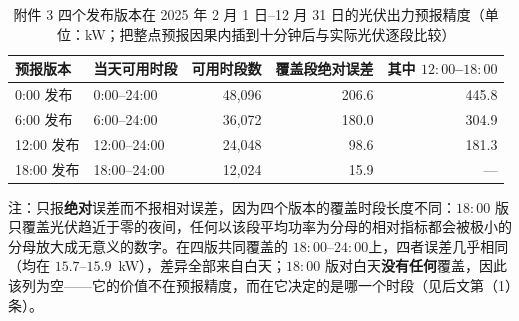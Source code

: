 \begin{table}[htbp]
  \centering
  \caption{附件 3 四个发布版本在 2025 年 2 月 1 日--12 月 31 日的光伏出力预报精度（单位：kW；把整点预报因果内插到十分钟后与实际光伏逐段比较）}
  \label{tab:p3-skill}
  \footnotesize
  \begin{tabular}{llrrr}
    \toprule
    预报版本 & 当天可用时段 & 可用时段数 & 覆盖段绝对误差 & 其中 $12{:}00$--$18{:}00$ \\
    \midrule
    0{:}00 发布 & 0{:}00--24{:}00 & 48,096 & 206.6 & 445.8 \\
    6{:}00 发布 & 6{:}00--24{:}00 & 36,072 & 180.0 & 304.9 \\
    12{:}00 发布 & 12{:}00--24{:}00 & 24,048 & 98.6 & 181.3 \\
    18{:}00 发布 & 18{:}00--24{:}00 & 12,024 & 15.9 & --- \\
    \bottomrule
  \end{tabular}
  \par\vspace{2pt}
  \begin{minipage}{.92\textwidth}\footnotesize
    注：只报\textbf{绝对}误差而不报相对误差，因为四个版本的覆盖时段长度不同：$18{:}00$ 版只覆盖光伏趋近于零的夜间，任何以该段平均功率为分母的相对指标都会被极小的分母放大成无意义的数字。在四版共同覆盖的 $18{:}00$--$24{:}00$上，四者误差几乎相同（均在 $15.7$--$15.9$~kW），差异全部来自白天；$18{:}00$ 版对白天\textbf{没有任何}覆盖，因此该列为空——它的价值不在预报精度，而在它决定的是哪一个时段（见后文第（1）条）。
  \end{minipage}
\end{table}

